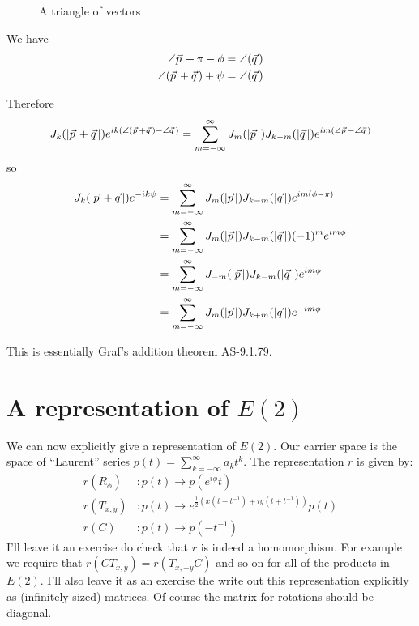 \documentclass{article}
\newcommand\myvec[1]{\vec{#1}\hspace{0.5mm}}
\begin{document}
\begin{figure}
\centering
{}
\caption{A triangle of vectors}
\label{triangle}
\end{figure}
We have
\begin{align*}
\angle\myvec{p}+\pi-\phi & = \angle(\myvec{q}) \\
\angle(\myvec{p}+\myvec{q})+\psi & = \angle(\myvec{q}) 
\end{align*}

Therefore
\[
J_k(|\myvec{p}+\myvec{q}|)e^{ik(\angle(\myvec{p}+\myvec{q})-\angle\myvec{q})} = \sum_{m=-\infty}^\infty J_m(|\myvec{p}|)J_{k-m}(|\myvec{q}|)e^{im(\angle\myvec{p}-\angle\myvec{q})}
\]
so
\begin{align*}
J_k(|\myvec{p}+\myvec{q}|)e^{-ik\psi} & = \sum_{m=-\infty}^\infty J_m(|\myvec{p}|)J_{k-m}(|\myvec{q}|)e^{im(\phi-\pi)} \\
                                 & = \sum_{m=-\infty}^\infty J_m(|\myvec{p}|)J_{k-m}(|\myvec{q}|)(-1)^me^{im\phi} \\
                                 & = \sum_{m=-\infty}^\infty J_{-m}(|\myvec{p}|)J_{k-m}(|\myvec{q}|)e^{im\phi} \\
                                 & = \sum_{m=-\infty}^\infty J_m(|\myvec{p}|)J_{k+m}(|\myvec{q}|)e^{-im\phi}
\end{align*}

This is essentially Graf's addition theorem AS-9.1.79.

\section{A representation of $E(2)$}
We can now explicitly give a representation of $E(2)$.
Our carrier space is the space of ``Laurent'' series $p(t)=\sum_{k=-\infty}^\infty a_kt^k$.
The representation $r$ is given by:
\begin{align*}
r(R_\phi) & : p(t) \rightarrow p(e^{i\phi}t)\\
r(T_{x,y}) & : p(t) \rightarrow e^{\frac{1}{2}(x(t-t^{-1})+iy(t+t^{-1}))}p(t) \\
r(C) & : p(t) \rightarrow p(-t^{-1})
\end{align*}
I'll leave it an exercise do check that $r$ is indeed a homomorphism.
For example we require that $r(CT_{x,y}) = r(T_{x,-y}C)$ and so on for all of the products in $E(2)$.
I'll also leave it as an exercise the write out this representation explicitly as (infinitely sized) matrices.
Of course the matrix for rotations should be diagonal.
\end{document}

